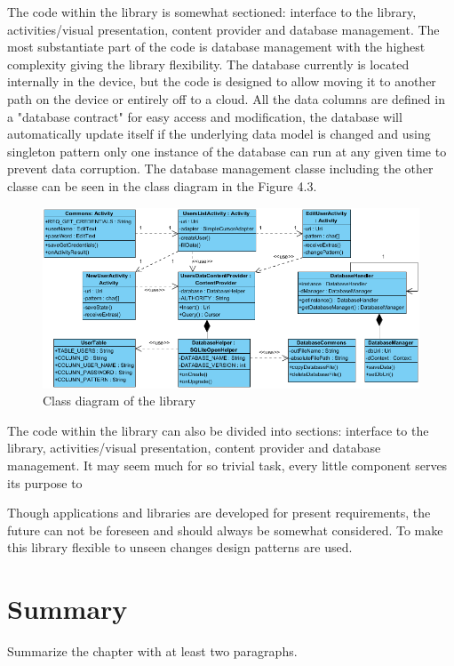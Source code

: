The code within the library is somewhat sectioned: interface to the library, activities/visual presentation, content provider and database management. The most substantiate part of the code is database management with the highest complexity giving  the library flexibility. The database currently is located internally in the device, but the code is designed to allow moving it to another path on the device or entirely off to a cloud. All the data columns are defined in a "database contract" for easy access and modification, the database will automatically update itself if the underlying data model is changed and using singleton pattern only one instance of the database can run at any given time to prevent data corruption. The database management classe including the other classe can be seen in the class diagram in the Figure 4.3.

\begin{figure}[h]
\begin{center}
\includegraphics[scale=1]{images/classdiagram.png}
\caption{Class diagram of the library} \label{fig:class diagram} 
\end{center}
\end{figure}

The code within the library can also be divided into sections: interface to the library, activities/visual presentation, content provider and database management. It may seem much for so trivial task, every little component serves its purpose to 

Though applications and libraries are developed for present requirements, the future can not be foreseen and should always be somewhat considered. To make this library flexible to unseen changes design patterns are used. 

\section{Summary}
Summarize the chapter with at least two paragraphs.




